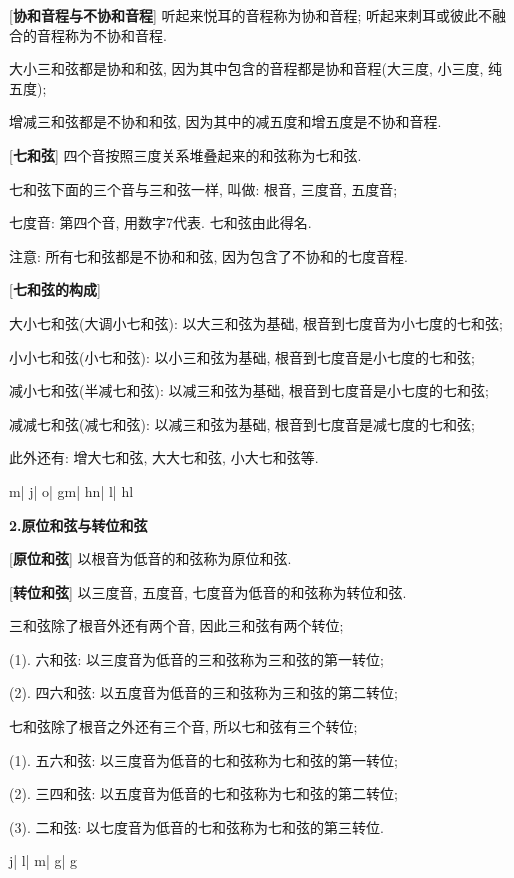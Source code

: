 \clearpage

[\textbf{协和音程与不协和音程}] 听起来悦耳的音程称为协和音程; 听起来刺耳或彼此不融合的音程称为不协和音程.\par
\qquad 大小三和弦都是协和和弦, 因为其中包含的音程都是协和音程(大三度, 小三度, 纯五度);\par
\qquad 增减三和弦都是不协和和弦, 因为其中的减五度和增五度是不协和音程.\par

[\textbf{七和弦}] 四个音按照三度关系堆叠起来的和弦称为七和弦.\par
\qquad 七和弦下面的三个音与三和弦一样, 叫做: 根音, 三度音, 五度音;\par
\qquad 七度音: 第四个音, 用数字7代表. 七和弦由此得名.\par
\qquad 注意: 所有七和弦都是不协和和弦, 因为包含了不协和的七度音程.\par

[\textbf{七和弦的构成}]\par
\qquad 大小七和弦(大调小七和弦): 以大三和弦为基础, 根音到七度音为小七度的七和弦;\par
\qquad 小小七和弦(小七和弦): 以小三和弦为基础, 根音到七度音是小七度的七和弦;\par
\qquad 减小七和弦(半减七和弦): 以减三和弦为基础, 根音到七度音是小七度的七和弦;\par
\qquad 减减七和弦(减七和弦): 以减三和弦为基础, 根音到七度音是减七度的七和弦;\par
\qquad 此外还有: 增大七和弦, 大大七和弦, 小大七和弦等.\par
\startextract
\Notes {}\wh m\en\bar
\Notes {}\wh j\en\bar
\Notes {}\wh o\en\bar
\Notes \sh g\wh m\en\bar
\Notes \fl h\wh n\en\bar
\Notes {}\wh l\en\bar
\Notes \fl h\wh l\en
\zendextract

\begin{center}
 \textbf{2.原位和弦与转位和弦}\\
\end{center}

[\textbf{原位和弦}] 以根音为低音的和弦称为原位和弦.\par

[\textbf{转位和弦}] 以三度音, 五度音, 七度音为低音的和弦称为转位和弦.\par
\qquad 三和弦除了根音外还有两个音, 因此三和弦有两个转位;\par
\qquad \qquad (1). 六和弦: 以三度音为低音的三和弦称为三和弦的第一转位;\par
\qquad \qquad (2). 四六和弦: 以五度音为低音的三和弦称为三和弦的第二转位;\par
\qquad 七和弦除了根音之外还有三个音, 所以七和弦有三个转位;\par
\qquad \qquad (1). 五六和弦: 以三度音为低音的七和弦称为七和弦的第一转位;\par
\qquad \qquad (2). 三四和弦: 以五度音为低音的七和弦称为七和弦的第二转位;\par
\qquad \qquad (3). 二和弦: 以七度音为低音的七和弦称为七和弦的第三转位.\par
\startextract
\Notes {}\wh j\en\bar
\Notes {}\wh l\en\bar
\Notes {}\lw m\en\bar
\Notes {}\rw g\en\bar
\Notes {}\rw g\en
\zendextract

